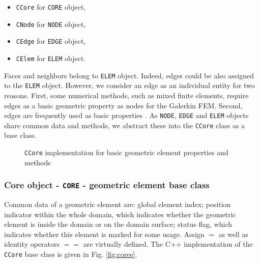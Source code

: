 \begin{itemize}
  \item \texttt{CCore} for \texttt{CORE} object,
  \item \texttt{CNode} for \texttt{NODE} object,
  \item \texttt{CEdge} for \texttt{EDGE} object,
  \item \texttt{CElem} for \texttt{ELEM} object.
\end{itemize}

Faces and neighbors belong to \texttt{ELEM} object. Indeed, edges
could be also assigned to the \texttt{ELEM} object. However, we
consider an edge as an individual entity for two reasons. First,
some numerical methods, such as mixed finite elements, require edges
as a basic geometric property as nodes for the Galerkin FEM. Second,
edges are frequently used as basic properties . As \texttt{NODE}, \texttt{EDGE} and \texttt{ELEM}
objects share common data and methods, we abstract these into the
\texttt{CCore} class as a base class.

\begin{figure}[H]
\centering
{}
\caption{\texttt{CCore} implementation for basic geometric element properties and methods}
\label{fig:core}
\end{figure}

\vfill

\newpage
\subsubsection{Core object - \texttt{CORE} - geometric element base class}
\label{sec:core}

Common data of a geometric element are: global element index;
position indicator within the whole domain, which indicates whether
the geometric element is inside the domain or on the domain surface;
status flag, which indicates whether this element is marked for
some usage. Assign $=$ as well as identity operators $==$ are
virtually defined. The C++ implementation of the \texttt{CCore} base
class is given in Fig. \ref{fig:coree}.

